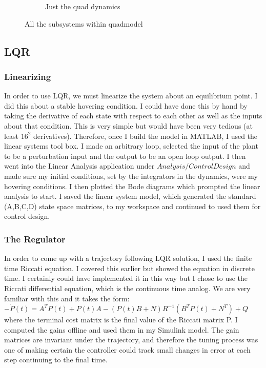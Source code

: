 \documentclass[conf]{new-aiaa}
\begin{document}
\begin{doublespace}
\begin{figure}[!h]
\begin{subfigure}{.33\textwidth}
  \caption{Just the quad dynamics}
  \label{sysdyn}
\end{subfigure}
\caption{All the subsystems within quadmodel}
\label{blocks}
\end{figure}



\subsection{LQR}
\subsubsection{Linearizing}
In order to use LQR, we must linearize the system about an equilibrium point. I did this about a stable hovering condition. I could have done this by hand by taking the derivative of each state with respect to each other as well as the inputs about that condition. This is very simple but would have been very tedious (at least $16^2$ derivatives). Therefore, once I build the model in MATLAB,  I used the linear systems tool box. I made an arbitrary loop, selected the input of the plant to be a perturbation input and the output to be an open loop output. I then went into the Linear Analysis application under $Analysis/Control Design$ and made sure my initial conditions, set by the integrators in the dynamics, were my hovering conditions. I then plotted the Bode diagrams which prompted the linear analysis to start. I saved the linear system model, which generated the standard (A,B,C,D) state space matrices, to my workspace and continued to used them for control design.

\subsubsection{The Regulator}
In order to come up with a trajectory following LQR solution, I used the finite time Riccati equation. I covered this earlier but showed the equation in discrete time. I certainly could have implemented it in this way but I chose to use the Riccati differential equation, which is the continuous time analog. We are very familiar with this and it takes the form:$-{\dot {P}}(t) = A^{T}P(t)+P(t)A-(P(t)B+N)R^{-1}(B^{T}P(t)+N^{T})+Q$ where the terminal cost matrix is the final value of the Riccati matrix P. I computed the gains offline and used them in my Simulink model. The gain matrices are invariant under the trajectory, and therefore the tuning process was one of making certain the controller could track small changes in error at each step continuing to the final time. 


\end{doublespace}
\end{document}
